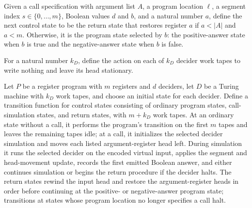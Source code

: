 \begin{definition}
\label{Complexity.LogProg.nextRet}
\leanok
{}
Given a call specification with argument list $A$, a program location $\ell$, a segment
index $s\in\{0,\ldots,m\}$, Boolean values $d$ and $b$, and a natural number $a$, define
the next control state to be the return state that restores register $a$ if $a<|A|$ and
$a<m$. Otherwise, it is the program state selected by $b$: the positive-answer state
when $b$ is true and the negative-answer state when $b$ is false.
\end{definition}

\begin{definition}
\label{Complexity.LogProg.dIdle}
\leanok
For a natural number $k_D$, define the action on each of $k_D$ decider work tapes to
write nothing and leave its head stationary.
\end{definition}

\begin{definition}
\label{Complexity.LogProg.ctr}
\leanok
{}
Let $P$ be a register program with $m$ registers and $d$ deciders, let $D$ be a Turing
machine with $k_D$ work tapes, and choose an initial state for each decider. Define a
transition function for control states consisting of ordinary program states,
call-simulation states, and return states, with $m+k_D$ work tapes. At an ordinary state
without a call, it performs the program’s transition on the first $m$ tapes and leaves
the remaining tapes idle; at a call, it initializes the selected decider simulation and
moves each listed argument-register head left. During simulation it runs the selected
decider on the encoded virtual input, applies the segment and head-movement update,
records the first emitted Boolean answer, and either continues simulation or begins the
return procedure if the decider halts. The return states rewind the input head and
restore the argument-register heads in order before continuing at the positive- or
negative-answer program state; transitions at states whose program location no longer
specifies a call halt.
\end{definition}

